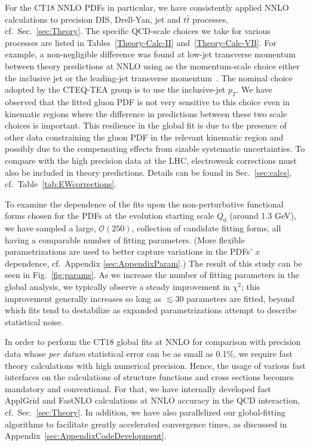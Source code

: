 For the CT18 NNLO PDFs in particular, we have consistently applied NNLO calculations to precision DIS, Drell-Yan, jet and $t \bar t$ processes, cf.~Sec.~\ref{sec:Theory}. The specific QCD-scale choices
we take for various processes are listed in Tables~\ref{Theory-Calc-II} and~\ref{Theory-Calc-VB}.
For example, a non-negligible difference was found at low-jet transverse momentum between theory predictions at NNLO using as the momentum-scale choice either the inclusive jet or the
leading-jet transverse momentum~\cite{Currie:2018xkj}. The nominal choice adopted by the CTEQ-TEA group is to use the inclusive-jet $p_T$. 
We have observed that the fitted gluon PDF is not very sensitive to this choice even in kinematic regions where the difference in predictions between these two scale choices is important.
 This resilience in the global 
fit is due to the presence of other data constraining the gluon PDF in 
the relevant kinematic region and possibly due to the compensating effects from sizable systematic uncertainties.
To compare with the high precision data at the
LHC, electroweak corrections must also be included in theory predictions. Details can be found in Sec.~\ref{sec:calcs}, cf.~Table~\ref{tab:EWcorrections}.


To examine the dependence of the fits upon the non-perturbative functional forms chosen for the PDFs at the evolution starting scale $Q_0$ (around 1.3 GeV), we have sampled a large,
$\mathcal{O}(250)$, collection of candidate fitting forms, all having a comparable number of fitting parameters. (More flexible parametrizations are used to better capture variations in
the PDFs' $x$ dependence, cf.~Appendix \ref{sec:AppendixParam}.)
The result of this study can be seen in Fig.~\ref{fig:params}.
As we increase the number of fitting parameters in the global analysis,
we typically observe a steady improvement in $\chi^2$; this improvement generally
increases so long as $\lesssim\! 30$ parameters are fitted, beyond which fits tend
to destabilize as expanded parametrizations attempt to describe statistical noise.


In order to perform the CT18 global fits at NNLO for comparison with precision data whose {\it per datum} statistical error can be as small as 0.1\%, 
we require fast theory calculations with high numerical precision. 
Hence, the usage of various fast interfaces on the calculations of structure functions and cross sections becomes mandatory and conventional.
For that, we have internally developed fast ApplGrid and FastNLO calculations at NNLO accuracy in the QCD interaction, cf.~Sec.~\ref{sec:Theory}.
In addition, we have also parallelized our global-fitting algorithms to facilitate greatly accelerated convergence times, as discussed in Appendix~\ref{sec:AppendixCodeDevelopment}.


